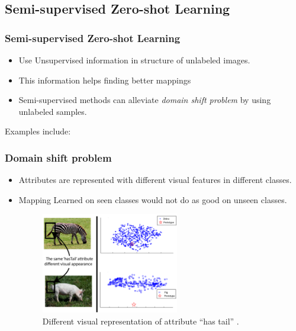 \documentclass{beamer}
\begin{document}
\subsection{Semi-supervised Zero-shot Learning}
\label{sec:Semi-supervised Zero-shot Learning}
\begin{frame}\frametitle{Semi-supervised Zero-shot Learning}
\begin{itemize}
  \item Use Unsupervised information in structure of unlabeled images.
  \item This information helps finding better mappings \pause
  \item Semi-supervised methods can alleviate \textit{domain shift problem} by using unlabeled samples.
\end{itemize}
\vspace{1cm}
\pause
Examples include: \cite{semi15,li15max,Kodirov2015,Fu2014}
\end{frame}

\begin{frame}\frametitle{Domain shift problem}
  \begin{itemize}
    \item Attributes are represented with different visual features in different classes.
    \item Mapping Learned on seen classes would not do as good on unseen classes.
    \begin{figure}
      \centering
      \includegraphics[width=6cm]{domain-shift.png}
      \caption{\scriptsize
      Different visual representation of attribute ``has tail'' \cite{Fu2014}.
      }
    \end{figure}
  \end{itemize}
\end{frame}
\end{document}

